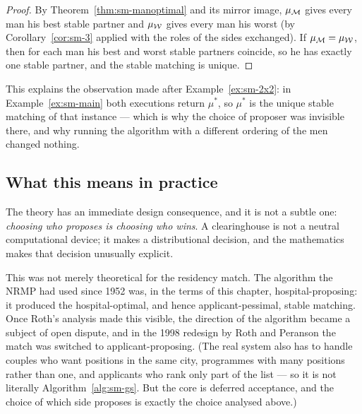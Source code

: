 \begin{proof}
By Theorem~\ref{thm:sm-manoptimal} and its mirror image, $\mu_{\mathcal{M}}$ gives every
man his best stable partner and $\mu_{\mathcal{W}}$ gives every man his worst (by
Corollary~\ref{cor:sm-3} applied with the roles of the sides exchanged). If
$\mu_{\mathcal{M}} = \mu_{\mathcal{W}}$, then for each man his best and worst stable
partners coincide, so he has exactly one stable partner, and the stable
matching is unique.
\end{proof}

This explains the observation made after Example~\ref{ex:sm-2x2}: in
Example~\ref{ex:sm-main} both executions return $\mu^*$, so $\mu^*$ is the unique
stable matching of that instance --- which is why the choice of proposer was
invisible there, and why running the algorithm with a different ordering of
the men changed nothing.

\subsection{What this means in practice}

The theory has an immediate design consequence, and it is not a subtle one:
\emph{choosing who proposes is choosing who wins}. A clearinghouse is not a
neutral computational device; it makes a distributional decision, and the
mathematics makes that decision unusually explicit.

This was not merely theoretical for the residency match. The algorithm the
NRMP had used since 1952 was, in the terms of this chapter, hospital-proposing:
it produced the hospital-optimal, and hence applicant-pessimal, stable
matching. Once Roth's analysis made this visible, the direction of the
algorithm became a subject of open dispute, and in the 1998 redesign by Roth
and Peranson the match was switched to applicant-proposing. (The real system
also has to handle couples who want positions in the same city, programmes
with many positions rather than one, and applicants who rank only part of the
list --- so it is not literally Algorithm~\ref{alg:sm-gs}. But the core is
deferred acceptance, and the choice of which side proposes is exactly the
choice analysed above.)

